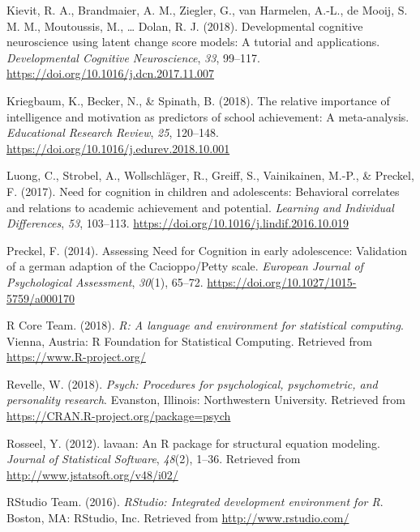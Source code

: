 \documentclass[
  man]{apa6}
\newlength{\cslhangindent}
\newlength{\cslentryspacingunit} %
\newenvironment{CSLReferences}[2] %
 {%
  \setlength{\parindent}{0pt}
  \ifodd #1
  \let\oldpar\par
  \def\par{\hangindent=\cslhangindent\oldpar}
  \fi
  \setlength{\parskip}{#2\cslentryspacingunit}
 }%
 {}
\begin{document}
\begin{CSLReferences}{1}{0}
\leavevmode{}%
Kievit, R. A., Brandmaier, A. M., Ziegler, G., van Harmelen, A.-L., de Mooij, S. M. M., Moutoussis, M., \ldots{} Dolan, R. J. (2018). Developmental cognitive neuroscience using latent change score models: A tutorial and applications. \emph{Developmental Cognitive Neuroscience}, \emph{33}, 99--117. \url{https://doi.org/10.1016/j.dcn.2017.11.007}

\leavevmode{}%
Kriegbaum, K., Becker, N., \& Spinath, B. (2018). The relative importance of intelligence and motivation as predictors of school achievement: A meta-analysis. \emph{Educational Research Review}, \emph{25}, 120--148. \url{https://doi.org/10.1016/j.edurev.2018.10.001}

\leavevmode{}%
Luong, C., Strobel, A., Wollschläger, R., Greiff, S., Vainikainen, M.-P., \& Preckel, F. (2017). Need for cognition in children and adolescents: Behavioral correlates and relations to academic achievement and potential. \emph{Learning and Individual Differences}, \emph{53}, 103--113. \url{https://doi.org/10.1016/j.lindif.2016.10.019}

\leavevmode{}%
Preckel, F. (2014). Assessing {Need} for {Cognition} in early adolescence: Validation of a german adaption of the {Cacioppo}/{Petty} scale. \emph{European Journal of Psychological Assessment}, \emph{30}(1), 65--72. \url{https://doi.org/10.1027/1015-5759/a000170}

\leavevmode{}%
R Core Team. (2018). \emph{R: A language and environment for statistical computing}. Vienna, Austria: R Foundation for Statistical Computing. Retrieved from \url{https://www.R-project.org/}

\leavevmode{}%
Revelle, W. (2018). \emph{Psych: Procedures for psychological, psychometric, and personality research}. Evanston, Illinois: Northwestern University. Retrieved from \url{https://CRAN.R-project.org/package=psych}

\leavevmode{}%
Rosseel, Y. (2012). {lavaan}: An {R} package for structural equation modeling. \emph{Journal of Statistical Software}, \emph{48}(2), 1--36. Retrieved from \url{http://www.jstatsoft.org/v48/i02/}

\leavevmode{}%
RStudio Team. (2016). \emph{RStudio: Integrated development environment for {R}}. Boston, MA: RStudio, Inc. Retrieved from \url{http://www.rstudio.com/}


\end{CSLReferences}
\end{document}
